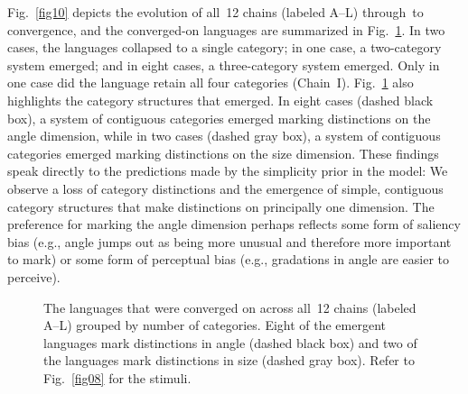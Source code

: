 \documentclass[doc,biblatex]{apa7}
\begin{document}
Fig.~\ref{fig10} depicts the evolution of all~12 chains (labeled A--L) through~to convergence, and the converged-on languages are summarized in Fig.~\ref{fig11}. In two cases, the languages collapsed to a single category; in one case, a two-category system emerged; and in eight cases, a three-category system emerged. Only in one case did the language retain all four categories (Chain~I). Fig.~\ref{fig11} also highlights the category structures that emerged. In eight cases (dashed black box), a system of contiguous categories emerged marking distinctions on the angle dimension, while in two cases (dashed gray box), a system of contiguous categories emerged marking distinctions on the size dimension. These findings speak directly to the predictions made by the simplicity prior in the model: We observe a loss of category distinctions and the emergence of simple, contiguous category structures that make distinctions on principally one dimension. The preference for marking the angle dimension perhaps reflects some form of saliency bias (e.g., angle jumps out as being more unusual and therefore more important to mark) or some form of perceptual bias (e.g., gradations in angle are easier to perceive).

	\begin{figure}
	\vspace*{2pt}
	\caption{The languages that were converged on across all~12 chains (labeled A--L) grouped by number of categories. Eight of the emergent languages mark distinctions in angle (dashed black box) and two of the languages mark distinctions in size (dashed gray box). Refer to Fig.~\ref{fig08} for the stimuli.}
	\label{fig11}
	\end{figure}
\end{document}
